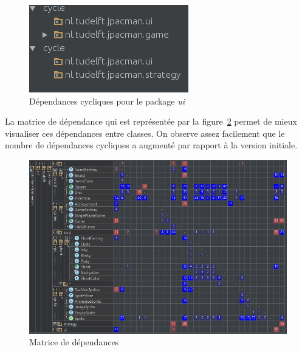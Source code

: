 \documentclass[12pt, openany]{report}
\begin{document}
\begin{figure}[!h]
	\centering
	\includegraphics[scale=0.6]{Images/CyclicDependencyFinal13.png}    
		\caption{Dépendances cycliques pour le package \textit{ui}}
	\label{CyclicDependencyFinal8}
\end{figure}




\newpage
La matrice de dépendance qui est représentée par la figure~\ref{DependencyMatrix2} permet de mieux visualiser ces dépendances entre classes. On observe assez facilement que le nombre de dépendances cycliques a augmenté par rapport à la version initiale.

\begin{figure}[!h]
	\centering
	\includegraphics[scale=0.5]{Images/DependencyMatrix2.JPG}
	\caption{Matrice de dépendances}
	\label{DependencyMatrix2}
\end{figure} 
\end{document}
